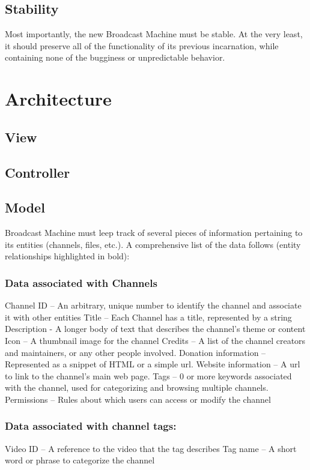 \documentclass[a4paper,12pt]{report}
\begin{document}
\section{Stability}

	Most importantly, the new Broadcast Machine must be stable. At the very least, it should preserve all of the functionality of its previous incarnation, while containing none of the bugginess or unpredictable behavior. 

\chapter{Architecture}

\section{View}

\section{Controller}

\section{Model}
Broadcast Machine must leep track of  several pieces of information pertaining to its entities (channels, files, etc.). A comprehensive list of the data follows (entity relationships highlighted in bold):

\subsection{Data associated with Channels}
Channel ID – An arbitrary, unique number to identify the channel and associate it 		with other entities
Title – Each Channel has a title, represented by a string
Description - A longer body of text that describes the channel's theme or content
Icon – A thumbnail image for the channel
Credits – A list of the channel creators and maintainers, or any other people 	involved. 
Donation information – Represented as a snippet of HTML or a simple url.
Website information – A url to link to the channel's main web page.
Tags – 0 or more keywords associated with the channel, used for categorizing and 	browsing multiple channels.
Permissions – Rules about which users can access or modify the channel

\subsection{Data associated with channel tags:}
	Video ID – A reference to the video that the tag describes
	Tag name – A short word or phrase to categorize the channel
\end{document}
